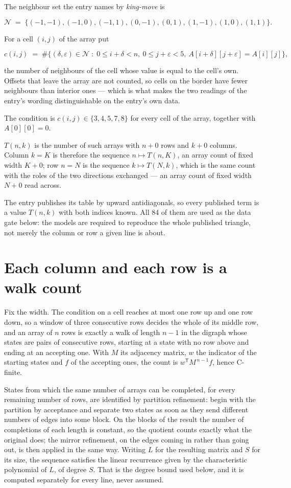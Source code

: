 \documentclass[11pt]{article}
\theoremstyle{definition}
\begin{document}
The neighbour set the entry names by {\itshape king-move} is

\[\mathcal{N} \;=\; \{(-1,-1), (-1,0), (-1,1), (0,-1), (0,1), (1,-1), (1,0), (1,1)\}.\]

For a cell $(i,j)$ of the array put

\[c(i,j) \;=\; \#\bigl\{(\delta,\varepsilon)\in\mathcal{N} \;:\; 0\le i+\delta<n,\ 0\le j+\varepsilon<5,\ A[i+\delta][j+\varepsilon] = A[i][j]\bigr\},\]

the number of neighbours of the cell whose value is equal to the cell's own. Offsets that leave the array are not counted, so cells on the border have fewer neighbours than interior ones --- which is what makes the two readings of the entry's wording distinguishable on the entry's own data.

The condition is $c(i,j) \in \{3, 4, 5, 7, 8\}$ for every cell of the array, together with $A[0][0]=0$.

$T(n,k)$ is the number of such arrays with $n + 0$ rows and $k + 0$ columns. Column $k = K$ is therefore the sequence $n \mapsto T(n,K)$, an array count of fixed width $K + 0$; row $n = N$ is the sequence $k \mapsto T(N,k)$, which is the same count with the roles of the two directions exchanged --- an array count of fixed width $N + 0$ read across.

The entry publishes its table by upward antidiagonals, so every published term is a value $T(n,k)$ with both indices known. All 84 of them are used as the data gate below: the models are required to reproduce the whole published triangle, not merely the column or row a given line is about.

\section{Each column and each row is a walk count}

Fix the width. The condition on a cell reaches at most one row up and one row down, so a window of three consecutive rows decides the whole of its middle row, and an array of $n$ rows is exactly a walk of length $n-1$ in the digraph whose states are pairs of consecutive rows, starting at a state with no row above and ending at an accepting one. With $M$ its adjacency matrix, $w$ the indicator of the starting states and $f$ of the accepting ones, the count is $w^{\mathsf T}M^{\,n-1}f$, hence C-finite.

States from which the same number of arrays can be completed, for every remaining number of rows, are identified by partition refinement: begin with the partition by acceptance and separate two states as soon as they send different numbers of edges into some block. On the blocks of the result the number of completions of each length is constant, so the quotient counts exactly what the original does; the mirror refinement, on the edges coming in rather than going out, is then applied in the same way. Writing $L$ for the resulting matrix and $S$ for its size, the sequence satisfies the linear recurrence given by the characteristic polynomial of $L$, of degree $S$. That is the degree bound used below, and it is computed separately for every line, never assumed.
\end{document}
